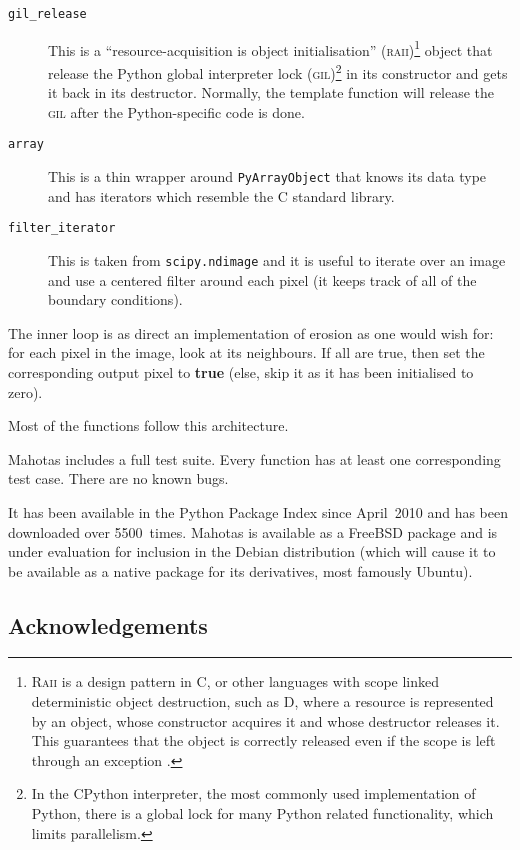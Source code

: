 \documentclass{article}
\newcommand*{\cpp}{{C\nolinebreak[4]\hspace{-.05em}\raisebox{.4ex}{\tiny\textbf{++}}}}
\let\code\texttt
\begin{document}
\begin{description}
\item[\code{gil\_release}] This is a ``resource-acquisition is object
initialisation'' (\textsc{raii})\footnote{\textsc{Raii} is a design pattern in
\cpp{}, or other languages with scope linked deterministic object destruction,
such as D, where a resource is represented by an object, whose constructor
acquires it and whose destructor releases it. This guarantees that the object
is correctly released even if the scope is left through an exception
\citep{Stroustrup1994}.} object that release the Python global interpreter lock
(\textsc{gil})\footnote{In the CPython interpreter, the most commonly used
implementation of Python, there is a global lock for many Python related
functionality, which limits parallelism.} in its constructor and gets it back
in its destructor. Normally, the template function will release the
\textsc{gil} after the Python-specific code is done.
\item[\code{array}] This is a thin wrapper around \code{PyArrayObject} that
knows its data type and has iterators which resemble the \cpp{} standard
library.
\item[\code{filter\_iterator}] This is taken from \code{scipy.ndimage} and it
is useful to iterate over an image and use a centered filter around each pixel
(it keeps track of all of the boundary conditions).
\end{description}

The inner loop is as direct an implementation of erosion as one would wish for:
for each pixel in the image, look at its neighbours. If all are true, then set
the corresponding output pixel to \textbf{true} (else, skip it as it has been
initialised to zero).

Most of the functions follow this architecture.

\medskip

Mahotas includes a full test suite. Every function has at least one
corresponding test case. There are no known bugs.

It has been available in the Python Package Index since April~2010 and has been
downloaded over 5500~times. Mahotas is available as a FreeBSD package and is
under evaluation for inclusion in the Debian distribution (which will cause it
to be available as a native package for its derivatives, most famously Ubuntu).

\subsection*{Acknowledgements}
\end{document}
